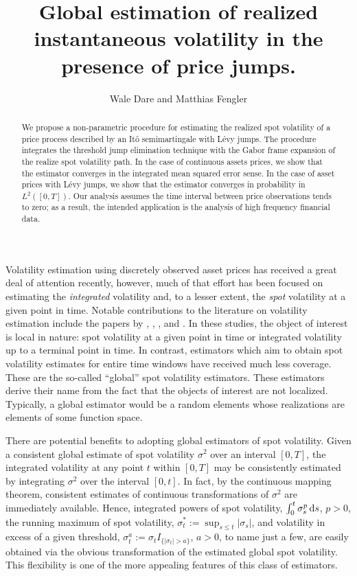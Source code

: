 \documentclass[a4paper, 12pt]{article}
\author{Wale Dare and Matthias Fengler}
\title {Global estimation of realized instantaneous volatility in the presence of \levy price jumps.}
\newcommand{\ito}{It\^o\xspace}
\renewcommand{\D}{\ensuremath{\dif}\xspace}
\newcommand{\levy}{L\'evy\xspace}
\begin{document}
\maketitle
\begin{abstract}
  We propose a non-parametric procedure for estimating the realized spot volatility of a price process described by  an \ito semimartingale with \levy jumps. The procedure integrates the threshold jump elimination technique \citep{Mancini2009}  with the Gabor frame expansion of the realize spot volatility path.  In the case of continuous assets prices, we show that the estimator converges  in the integrated mean squared error sense. In the case of  asset prices with \levy jumps,  we show that the estimator converges in probability  in $L^2([0,T])$. Our analysis assumes  the time interval between price observations tends to zero; as a result, the intended application is the analysis of high frequency financial data.    

\end{abstract}
Volatility estimation using discretely observed asset prices has received a great deal of attention recently, however,  much of that effort has been focused on 
estimating the \emph{integrated} volatility and, to a lesser extent, the \emph{spot} volatility at a given point in time. 
Notable contributions to the literature on volatility estimation include the papers by \cite{Foster1996}, \cite{Fan2008},   \cite{Florens1993}, and  \cite{BN2004}.
In these studies, the object of interest is local in nature: spot volatility at a given point in time or integrated volatility up to a terminal point in time. In contrast,  estimators which aim  to obtain {spot} volatility estimates  for  entire time windows  have received much less coverage. These are the so-called ``global'' spot volatility estimators. These estimators derive their name from   the fact that the objects of interest are not localized. Typically, a global estimator would be a    random elements whose realizations are  elements of some function space.     

There are potential benefits to adopting global estimators of spot volatility. Given a consistent global estimate of spot volatility $\sigma^2$ over an interval $[0,T]$, the  integrated volatility at any point $t$ within $[0,T]$ may be consistently estimated  by integrating $\sigma^2$ over the interval $[0,t]$.  In fact, by the continuous mapping theorem, consistent estimates of continuous transformations of $\sigma^2$ are immediately available. Hence, integrated powers of spot volatility, $\int^t_0\sigma^p_s \D s$, $p > 0$,  the running maximum of spot volatility, $\sigma^*_t := \sup_{s \le t} \vert \sigma_s \vert$, and volatility in  excess of a given threshold, $\sigma^a_t:=  \sigma_t  I_{\{\vert \sigma_t \vert > a\}}$, $a > 0$,  to name just a few, are easily obtained via  the obvious  transformation of the estimated  global spot volatility.   This flexibility is one of the more appealing features  of this class of estimators.
\end{document}
